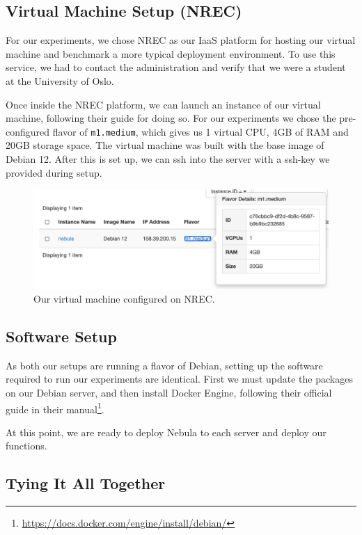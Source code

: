 \documentclass[
  table]{report}
\begin{document}
\subsection{Virtual Machine Setup (\ac{NREC})}

For our experiments, we chose \ac{NREC} as our \ac{IaaS} platform for
hosting our virtual machine and benchmark a more typical deployment
environment. To use this service, we had to contact the administration
and verify that we were a student at the University of Oslo.

Once inside the \ac{NREC} platform, we can launch an instance of our
virtual machine, following their guide for doing so. For our experiments
we chose the pre-configured flavor of \texttt{m1.medium}, which gives us
1 virtual CPU, 4GB of RAM and 20GB storage space. The virtual machine
was built with the base image of Debian 12. After this is set up, we can
ssh into the server with a ssh-key we provided during setup.

\begin{figure}[H]
\centering
  \includegraphics{assets/6-nrec_nebula}
  \caption{Our virtual machine configured on \ac{NREC}.}
  \label{fig:nrec_nebula}
\end{figure}

\subsection{Software Setup}

As both our setups are running a flavor of Debian, setting up the
software required to run our experiments are identical. First we must
update the packages on our Debian server, and then install Docker
Engine, following their official guide in their manual\footnote{\url{https://docs.docker.com/engine/install/debian/}}.

At this point, we are ready to deploy Nebula to each server and deploy
our functions.

\subsection{Tying It All Together}
\end{document}
